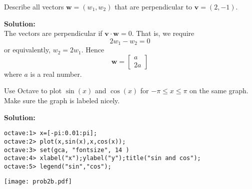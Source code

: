 \documentclass[12pt]{article}
\makeatletter
\theoremstyle{homework}
\newenvironment{exercise}[1]
{\def\@currentlabel{#1}\exercisecore}
{\endexercisecore}
\newcommand{\localhead}[1]{\par\smallskip\noindent\textbf{#1}\nobreak\\}%
\newcommand\solution{\localhead{Solution:}}
\makeatother
\begin{document}
\begin{exercise}{1.1}
Describe all vectors $\mathbf w = (w_1,w_2)$ that are perpendicular
to $\mathbf v = (2,-1)$.
\end{exercise}
\solution
The vectors are perpendicular if $\mathbf v \cdot \mathbf w = 0$.
That is, we require
\[
2w_1-w_2=0
\]
or equivalently, $w_2 = 2w_1$.  Hence 
\[
\mathbf w = \begin{bmatrix} a \\ 2a \end{bmatrix}
\]
where $a$ is a real number.

\begin{exercise}{1.2}
Use Octave to plot $\sin(x)$ and $\cos(x)$ for $-\pi \le x \le \pi$ on the same graph.
Make sure the graph is labeled nicely.
\end{exercise}
\solution
\begin{verbatim}
octave:1> x=[-pi:0.01:pi];
octave:2> plot(x,sin(x),x,cos(x));
octave:3> set(gca, "fontsize", 14 )
octave:4> xlabel("x");ylabel("y");title("sin and cos");
octave:5> legend("sin","cos");
\end{verbatim}
\begin{center}
\texttt{[image: prob2b.pdf]}
\end{center}
\end{document}
